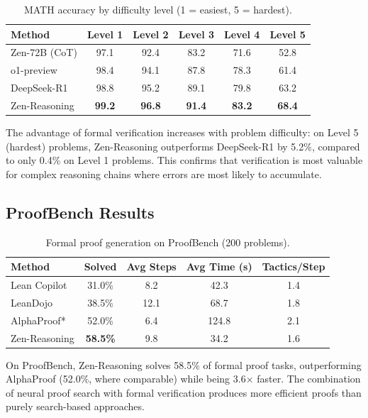 \documentclass[11pt,a4paper]{article}
\begin{document}
\begin{table}[t]
\centering
\caption{MATH accuracy by difficulty level (1 = easiest, 5 = hardest).}
\label{tab:math_difficulty}
\begin{tabular}{lccccc}
\toprule
\textbf{Method} & \textbf{Level 1} & \textbf{Level 2} & \textbf{Level 3} & \textbf{Level 4} & \textbf{Level 5} \\
\midrule
Zen-72B (CoT) & 97.1 & 92.4 & 83.2 & 71.6 & 52.8 \\
o1-preview & 98.4 & 94.1 & 87.8 & 78.3 & 61.4 \\
DeepSeek-R1 & 98.8 & 95.2 & 89.1 & 79.8 & 63.2 \\
\midrule
Zen-Reasoning & \textbf{99.2} & \textbf{96.8} & \textbf{91.4} & \textbf{83.2} & \textbf{68.4} \\
\bottomrule
\end{tabular}
\end{table}

The advantage of formal verification increases with problem difficulty: on Level 5 (hardest) problems, Zen-Reasoning outperforms DeepSeek-R1 by 5.2\%, compared to only 0.4\% on Level 1 problems. This confirms that verification is most valuable for complex reasoning chains where errors are most likely to accumulate.

\subsection{ProofBench Results}

\begin{table}[t]
\centering
\caption{Formal proof generation on ProofBench (200 problems).}
\label{tab:proofbench}
\begin{tabular}{lcccc}
\toprule
\textbf{Method} & \textbf{Solved} & \textbf{Avg Steps} & \textbf{Avg Time (s)} & \textbf{Tactics/Step} \\
\midrule
Lean Copilot & 31.0\% & 8.2 & 42.3 & 1.4 \\
LeanDojo & 38.5\% & 12.1 & 68.7 & 1.8 \\
AlphaProof* & 52.0\% & 6.4 & 124.8 & 2.1 \\
\midrule
Zen-Reasoning & \textbf{58.5\%} & 9.8 & 34.2 & 1.6 \\
\bottomrule
\end{tabular}
\end{table}

On ProofBench, Zen-Reasoning solves 58.5\% of formal proof tasks, outperforming AlphaProof (52.0\%, where comparable) while being 3.6$\times$ faster. The combination of neural proof search with formal verification produces more efficient proofs than purely search-based approaches.
\end{document}
